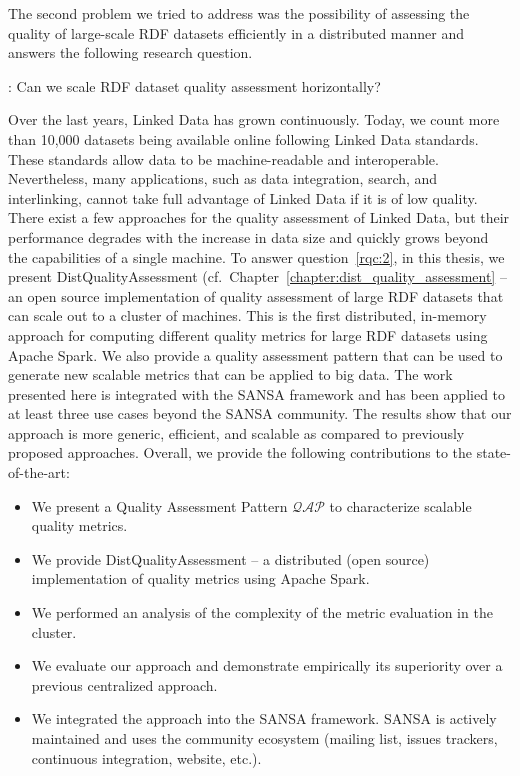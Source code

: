 The second problem we tried to address was the possibility of assessing the quality of large-scale \gls{RDF} datasets efficiently in a distributed manner and answers the following research question.

\begin{tcolorbox}
\textbf{\rqNr[RQ2]\label{rqc:2}}: Can we scale \gls{RDF} dataset quality assessment horizontally?
\end{tcolorbox}

Over the last years, Linked Data has grown continuously. 
Today, we count more than 10,000 datasets being available online following Linked Data standards. 
These standards allow data to be machine-readable and interoperable.  
Nevertheless, many applications, such as data integration, search, and interlinking, cannot take full advantage of Linked Data if it is of low quality.
There exist a few approaches for the quality assessment of Linked Data, but their performance degrades with the increase in data size and quickly grows beyond the capabilities of a single machine.
To answer question~\ref{rqc:2}, in this thesis, we present DistQualityAssessment (cf.\ Chapter~\ref{chapter:dist_quality_assessment} -- an open source implementation of quality assessment of large \gls{RDF} datasets that can scale out to a cluster of machines.
This is the first distributed, in-memory approach for computing different quality metrics for large \gls{RDF} datasets using Apache Spark. We also provide a quality assessment pattern that can be used to generate new scalable metrics that can be applied to big data.
The work presented here is integrated with the SANSA framework and has been applied to at least three use cases beyond the SANSA community.   
The results show that our approach is more generic, efficient, and scalable as compared to previously proposed approaches.
Overall, we provide the following contributions to the state-of-the-art:

\begin{itemize}
    \item We present a Quality Assessment Pattern $\mathcal{QAP}$ to characterize scalable quality metrics.
    \item We provide DistQualityAssessment -- a distributed (open source) implementation of quality metrics using Apache Spark.
    \item We performed an analysis of the complexity of the metric evaluation in the cluster.
    \item We evaluate our approach and demonstrate empirically its superiority over a previous centralized approach.
    \item We integrated the approach into the SANSA framework.
    SANSA is actively maintained and uses the community ecosystem (mailing list, issues trackers, continuous integration, website, etc.).
\end{itemize}

